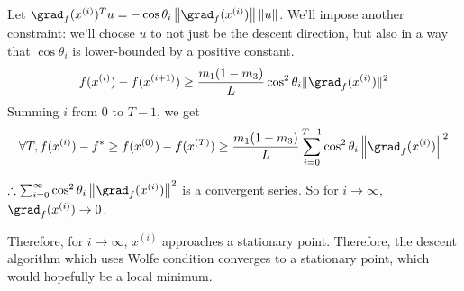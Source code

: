 Let $\grad_f(x^{(i)})^T u = -\cos\theta_i \left\|\grad_f(x^{(i)})\right\|\|u\|$.
We'll impose another constraint: we'll choose $u$ to not just be the descent direction,
but also in a way that $\cos\theta_i$ is lower-bounded by a positive constant.
\[ f(x^{(i)}) - f(x^{(i+1)}) \ge \frac{m_1(1-m_3)}{L} \cos^2\theta_i \|\grad_f(x^{(i)})\|^2 \]
Summing $i$ from $0$ to $T-1$, we get
\[ \forall T, f(x^{(i)}) - f^* \ge f(x^{(0)}) - f(x^{(T)})
\ge \frac{m_1(1-m_3)}{L} \sum_{i=0}^{T-1} \cos^2\theta_i \left\| \grad_f(x^{(i)}) \right\|^2 \]

$\therefore \sum_{i=0}^{\infty} \cos^2\theta_i \left\| \grad_f(x^{(i)}) \right\|^2$
is a convergent series. So for $i \rightarrow \infty$, $\grad_f(x^{(i)}) \rightarrow 0$.

Therefore, for $i \rightarrow \infty$, $x^{(i)}$ approaches a stationary point.
Therefore, the descent algorithm which uses Wolfe condition converges to a stationary point,
which would hopefully be a local minimum.


